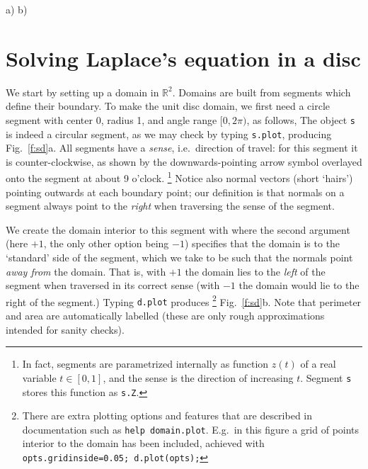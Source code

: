 \bfi %
a)
b)
\efi

\section{Solving Laplace's equation in a disc}
\label{s:lap}

We start by setting up a domain in $\mathbb{R}^2$.
Domains are built from segments which define their boundary.
To make the unit disc domain,
we first need a circle segment with center
0, radius 1, and angle range
$[0,2\pi)$, as follows,
The object {\tt s} is indeed a circular segment, as we may check by
typing {\tt s.plot}, producing Fig.~\ref{f:sd}a.
All segments have a {\em sense}, i.e.\ direction of travel:
for this segment it is counter-clockwise, as shown by the
downwards-pointing
arrow symbol overlayed onto the segment at about 9 o'clock.%
  \footnote{In fact, segments are parametrized internally as function $z(t)$
    of a real variable $t\in[0,1]$, and the sense is the direction of
    increasing $t$. Segment {\tt s} stores this function as {\tt s.Z}.}
Notice also normal vectors (short `hairs') pointing outwards
at each boundary point; our definition is that
normals on a segment always point to the {\em right} when traversing the
sense of the segment.

We create the domain interior to this segment with
where the second argument (here $+1$, the only other option being $-1$)
specifies that the domain is to the `standard' side of the segment, which
we take to be such that the normals point {\em away from} the domain.
That is, with $+1$ the domain lies to the {\em left} of the segment
when traversed in its correct sense (with $-1$ the domain
would lie to the right of the segment.)
Typing {\tt d.plot} produces%
  \footnote{There are extra plotting options and features that
    are described in documentation such as {\tt help domain.plot}.
    E.g.\ in this figure a grid of points interior to the domain has been
    included, achieved with {\tt opts.gridinside=0.05; d.plot(opts);}
  }
Fig.~\ref{f:sd}b.
Note that perimeter and area are automatically
labelled (these are only rough approximations intended for sanity checks).

